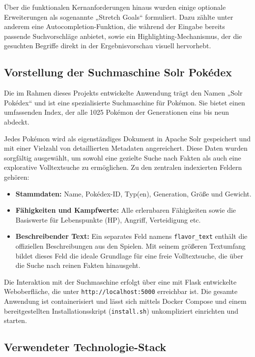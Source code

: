 Über die funktionalen Kernanforderungen hinaus wurden einige optionale Erweiterungen als sogenannte „Stretch Goals“ formuliert. Dazu zählte unter anderem eine Autocompletion-Funktion, die während der Eingabe bereits passende Suchvorschläge anbietet, sowie ein Highlighting-Mechanismus, der die gesuchten Begriffe direkt in der Ergebnisvorschau visuell hervorhebt.

\subsection{Vorstellung der Suchmaschine Solr Pokédex}
\label{sec:vorstellung_pokedex}

Die im Rahmen dieses Projekts entwickelte Anwendung trägt den Namen „Solr Pokédex“ und ist eine spezialisierte Suchmaschine für Pokémon. Sie bietet einen umfassenden Index, der alle 1025 Pokémon der Generationen eins bis neun abdeckt.

Jedes Pokémon wird als eigenständiges Dokument in Apache Solr gespeichert und mit einer Vielzahl von detaillierten Metadaten angereichert. Diese Daten wurden sorgfältig ausgewählt, um sowohl eine gezielte Suche nach Fakten als auch eine explorative Volltextsuche zu ermöglichen. Zu den zentralen indexierten Feldern gehören:
\begin{itemize}
    \item \textbf{Stammdaten:} Name, Pokédex-ID, Typ(en), Generation, Größe und Gewicht.
    \item \textbf{Fähigkeiten und Kampfwerte:} Alle erlernbaren Fähigkeiten sowie die Basiswerte für Lebenspunkte (HP), Angriff, Verteidigung etc.
    \item \textbf{Beschreibender Text:} Ein separates Feld namens \texttt{flavor\_text} enthält die offiziellen Beschreibungen aus den Spielen. Mit seinem größeren Textumfang bildet dieses Feld die ideale Grundlage für eine freie Volltextsuche, die über die Suche nach reinen Fakten hinausgeht.
\end{itemize}

Die Interaktion mit der Suchmaschine erfolgt über eine mit Flask entwickelte Weboberfläche, die unter \texttt{http://localhost:5000} erreichbar ist. Die gesamte Anwendung ist containerisiert und lässt sich mittels Docker Compose und einem bereitgestellten Installationsskript (\texttt{install.sh}) unkompliziert einrichten und starten.

\subsection{Verwendeter Technologie-Stack}
\label{sec:tech_stack}

